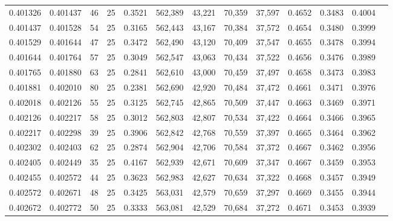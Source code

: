 \begin{tabular}{rrrrrrrrrrrrr}
0.401326 & 0.401437 &    46 &  25 &                                     0.3521 & 562,389 &  43,221 &  70,359 &  37,597 & 0.4652 & 0.3483 & 0.4004 \\
0.401437 & 0.401528 &    54 &  25 &                                     0.3165 & 562,443 &  43,167 &  70,384 &  37,572 & 0.4654 & 0.3480 & 0.3999 \\
0.401529 & 0.401644 &    47 &  25 &                                     0.3472 & 562,490 &  43,120 &  70,409 &  37,547 & 0.4655 & 0.3478 & 0.3994 \\
0.401644 & 0.401764 &    57 &  25 &                                     0.3049 & 562,547 &  43,063 &  70,434 &  37,522 & 0.4656 & 0.3476 & 0.3989 \\
0.401765 & 0.401880 &    63 &  25 &                                     0.2841 & 562,610 &  43,000 &  70,459 &  37,497 & 0.4658 & 0.3473 & 0.3983 \\
0.401881 & 0.402010 &    80 &  25 &                                     0.2381 & 562,690 &  42,920 &  70,484 &  37,472 & 0.4661 & 0.3471 & 0.3976 \\
0.402018 & 0.402126 &    55 &  25 &                                     0.3125 & 562,745 &  42,865 &  70,509 &  37,447 & 0.4663 & 0.3469 & 0.3971 \\
0.402126 & 0.402217 &    58 &  25 &                                     0.3012 & 562,803 &  42,807 &  70,534 &  37,422 & 0.4664 & 0.3466 & 0.3965 \\
0.402217 & 0.402298 &    39 &  25 &                                     0.3906 & 562,842 &  42,768 &  70,559 &  37,397 & 0.4665 & 0.3464 & 0.3962 \\
0.402302 & 0.402403 &    62 &  25 &                                     0.2874 & 562,904 &  42,706 &  70,584 &  37,372 & 0.4667 & 0.3462 & 0.3956 \\
0.402405 & 0.402449 &    35 &  25 &                                     0.4167 & 562,939 &  42,671 &  70,609 &  37,347 & 0.4667 & 0.3459 & 0.3953 \\
0.402455 & 0.402572 &    44 &  25 &                                     0.3623 & 562,983 &  42,627 &  70,634 &  37,322 & 0.4668 & 0.3457 & 0.3949 \\
0.402572 & 0.402671 &    48 &  25 &                                     0.3425 & 563,031 &  42,579 &  70,659 &  37,297 & 0.4669 & 0.3455 & 0.3944 \\
0.402672 & 0.402772 &    50 &  25 &                                     0.3333 & 563,081 &  42,529 &  70,684 &  37,272 & 0.4671 & 0.3453 & 0.3939 \\

\end{tabular}
